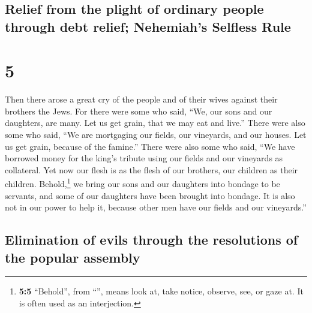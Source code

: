 \hypertarget{relief-from-the-plight-of-ordinary-people-through-debt-relief-nehemiahs-selfless-rule}{%
\subsection{Relief from the plight of ordinary people through debt
relief; Nehemiah's Selfless
Rule}\label{relief-from-the-plight-of-ordinary-people-through-debt-relief-nehemiahs-selfless-rule}}

\hypertarget{section-4}{%
\section{5}\label{section-4}}

 Then there arose a great cry of the people and of their
wives against their brothers the Jews.  For there were
some who said, ``We, our sons and our daughters, are many. Let us get
grain, that we may eat and live.''  There were also some
who said, ``We are mortgaging our fields, our vineyards, and our houses.
Let us get grain, because of the famine.''  There were
also some who said, ``We have borrowed money for the king's tribute
using our fields and our vineyards as collateral.  Yet now
our flesh is as the flesh of our brothers, our children as their
children. Behold,\footnote{\textbf{5:5} ``Behold'', from
  ``'', means look at, take notice, observe, see, or gaze
  at. It is often used as an interjection.} we bring our sons and our
daughters into bondage to be servants, and some of our daughters have
been brought into bondage. It is also not in our power to help it,
because other men have our fields and our vineyards.''

\hypertarget{elimination-of-evils-through-the-resolutions-of-the-popular-assembly}{%
\subsection{Elimination of evils through the resolutions of the popular
assembly}\label{elimination-of-evils-through-the-resolutions-of-the-popular-assembly}}


